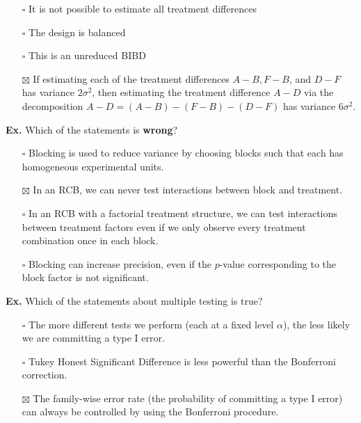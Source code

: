\begin{itemize}
	\item[$\square$] It is not possible to estimate all treatment differences
	\item[$\square$] The design is balanced
	\item[$\square$] This is an unreduced BIBD
	\item[$\boxtimes$] If estimating each of the treatment differences $A - B, F - B$, and $D - F$ has variance $2 \sigma^2$, then estimating the treatment difference $A - D$ via the decomposition $A - D = (A -B) - (F - B) - (D - F)$ has variance $6 \sigma^2$.
\end{itemize}


\hrulefill

\textbf{Ex.} Which of the statements is \textbf{wrong}?
\begin{itemize}
	\item[$\square$] Blocking is used to reduce variance by choosing blocks such that each has homogeneous experimental units.
	\item[$\boxtimes$] In an RCB, we can never test interactions between block and treatment.
	\item[$\square$] In an RCB with a factorial treatment structure, we can test interactions between treatment factors even if we only observe every treatment combination once in each block.
	\item[$\square$] Blocking can increase precision, even if the $p$-value corresponding to the block factor is not significant.
\end{itemize}


\hrulefill

\textbf{Ex.} Which of the statements about multiple testing is true?
\begin{itemize}
	\item[$\square$] The more different tests we perform (each at a fixed level $\alpha$), the less likely we are committing a type I error.
	\item[$\square$] Tukey Honest Significant Difference is less powerful than the Bonferroni correction.
	\item[$\boxtimes$] The family-wise error rate (the probability of committing a type I error) can always be controlled by using the Bonferroni procedure. 
\end{itemize}